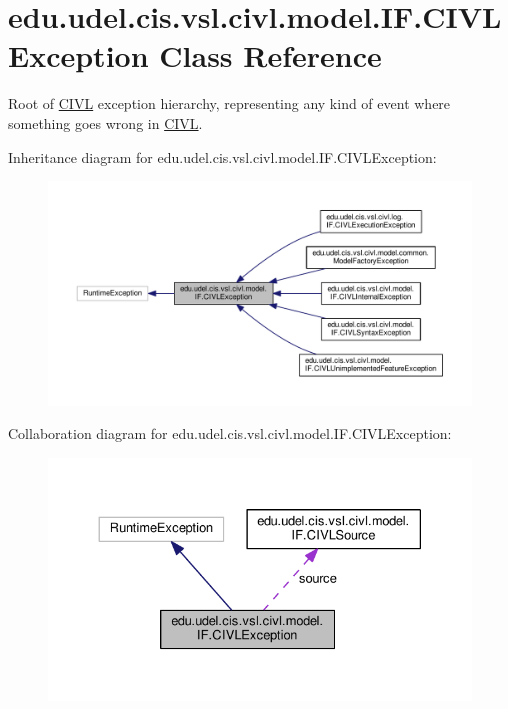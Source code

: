 \hypertarget{classedu_1_1udel_1_1cis_1_1vsl_1_1civl_1_1model_1_1IF_1_1CIVLException}{}\section{edu.\+udel.\+cis.\+vsl.\+civl.\+model.\+I\+F.\+C\+I\+V\+L\+Exception Class Reference}
\label{classedu_1_1udel_1_1cis_1_1vsl_1_1civl_1_1model_1_1IF_1_1CIVLException}


Root of \hyperlink{classedu_1_1udel_1_1cis_1_1vsl_1_1civl_1_1CIVL}{C\+I\+V\+L} exception hierarchy, representing any kind of event where something goes wrong in \hyperlink{classedu_1_1udel_1_1cis_1_1vsl_1_1civl_1_1CIVL}{C\+I\+V\+L}.  




Inheritance diagram for edu.\+udel.\+cis.\+vsl.\+civl.\+model.\+I\+F.\+C\+I\+V\+L\+Exception\+:
\nopagebreak
\begin{figure}[H]
\begin{center}
\leavevmode
\includegraphics[width=350pt]{classedu_1_1udel_1_1cis_1_1vsl_1_1civl_1_1model_1_1IF_1_1CIVLException__inherit__graph}
\end{center}
\end{figure}


Collaboration diagram for edu.\+udel.\+cis.\+vsl.\+civl.\+model.\+I\+F.\+C\+I\+V\+L\+Exception\+:
\nopagebreak
\begin{figure}[H]
\begin{center}
\leavevmode
\includegraphics[width=330pt]{classedu_1_1udel_1_1cis_1_1vsl_1_1civl_1_1model_1_1IF_1_1CIVLException__coll__graph}
\end{center}
\end{figure}

